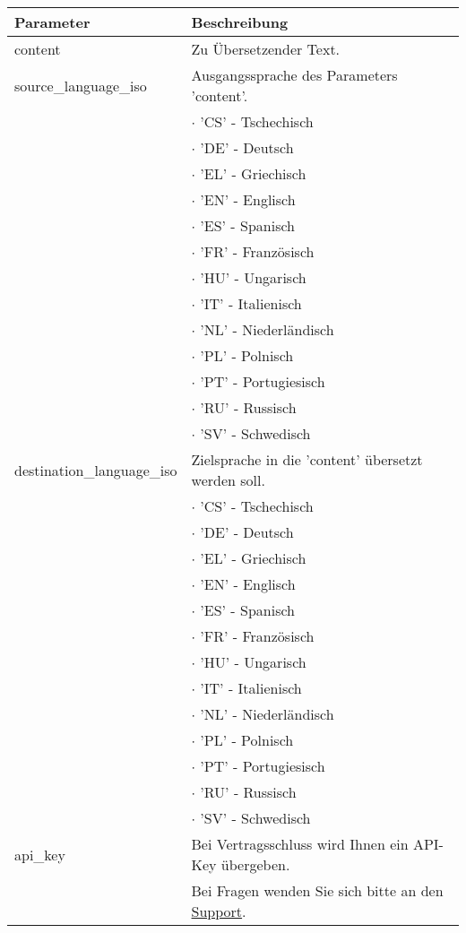 \begin{tabular}{ |l|l| }
	\hline
	Parameter & Beschreibung \\
	\hline
	content & Zu Übersetzender Text. \\
	\hline
	source\_language\_iso & Ausgangssprache des Parameters 'content'. \\
	 & \(\cdot\) 'CS' - Tschechisch \\
	 & \(\cdot\) 'DE' - Deutsch \\
	 & \(\cdot\) 'EL' - Griechisch \\
	 & \(\cdot\) 'EN' - Englisch \\
	 & \(\cdot\) 'ES' - Spanisch \\
	 & \(\cdot\) 'FR' - Französisch \\
	 & \(\cdot\) 'HU' - Ungarisch \\
	 & \(\cdot\) 'IT' - Italienisch \\
	 & \(\cdot\) 'NL' - Niederländisch \\
	 & \(\cdot\) 'PL' - Polnisch \\
	 & \(\cdot\) 'PT' - Portugiesisch \\
	 & \(\cdot\) 'RU' - Russisch \\
	 & \(\cdot\) 'SV' - Schwedisch \\
	 \hline
	destination\_language\_iso & Zielsprache in die 'content' übersetzt werden soll. \\
	 & \(\cdot\) 'CS' - Tschechisch \\
	 & \(\cdot\) 'DE' - Deutsch \\
	 & \(\cdot\) 'EL' - Griechisch \\
	 & \(\cdot\) 'EN' - Englisch \\
	 & \(\cdot\) 'ES' - Spanisch \\
	 & \(\cdot\) 'FR' - Französisch \\
	 & \(\cdot\) 'HU' - Ungarisch \\
	 & \(\cdot\) 'IT' - Italienisch \\
	 & \(\cdot\) 'NL' - Niederländisch \\
	 & \(\cdot\) 'PL' - Polnisch \\
	 & \(\cdot\) 'PT' - Portugiesisch \\
	 & \(\cdot\) 'RU' - Russisch \\
	 & \(\cdot\) 'SV' - Schwedisch \\
	 \hline
	api\_key & Bei Vertragsschluss wird Ihnen ein API-Key übergeben. \\
	 & Bei Fragen wenden Sie sich bitte an den {\href{mailto:support@ris-development.de}{Support}}. \\
	\hline
\end{tabular}


